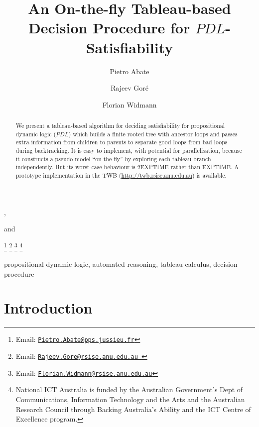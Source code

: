 \documentclass{entcs}
\newcommand{\pdl}{$PDL$}
\begin{document}
\begin{frontmatter}
  \title{An On-the-fly Tableau-based Decision Procedure for \pdl{}-Satisfiability} 
  \author[Canberra]{Pietro Abate},
  \author[Canberra]{Rajeev Gor\'e} and
  \author[Nicta]{Florian Widmann} 
  \address[Canberra]{Computer Sciences Laboratory
    \\The Australian National University
    \\ Canberra, Australia}
  \address[Nicta]{Computer Sciences Laboratory
    and Logic \& Computation Programme
    \\The Australian National University and NICTA
    \\ Canberra, Australia}
  \thanks[myemail]{Email:
    \href{mailto:Pietro.Abate@pps.jussieu.fr}
    {\texttt{\normalshape Pietro.Abate@pps.jussieu.fr}}} 
  \thanks[coemail]{Email:
    \href{mailto:Rajeev.Gore@rsise.anu.edu.au }
    {\texttt{\normalshape Rajeev.Gore@rsise.anu.edu.au }}}
  \thanks[cocoemail]{Email:
    \href{mailto:Florian.Widmann@rsise.anu.edu.au} 
    {\texttt{\normalshape Florian.Widmann@rsise.anu.edu.au}}}
  \thanks[NICTA]{National ICT Australia is
    funded by the Australian Government's Dept of Communications,
    Information Technology and the Arts and the Australian Research
    Council through Backing Australia's Ability and the ICT Centre of
    Excellence program.}
  \begin{abstract} 
    We present a tableau-based algorithm 
    for deciding satisfiability for propositional dynamic logic (\pdl{})
    which builds a finite rooted tree with ancestor loops
    and passes extra information from children to parents
    to separate good loops from bad loops during backtracking.
    It is easy to implement, with potential for parallelisation,
    because it constructs a pseudo-model ``on the fly''
    by exploring each tableau branch independently. But its
    worst-case behaviour is 2EXPTIME rather than EXPTIME.
    A prototype implementation in the TWB
    (\url{http://twb.rsise.anu.edu.au})
    is available.
  \end{abstract}
  \begin{keyword}
    propositional dynamic logic, automated reasoning, tableau calculus,
    decision procedure
  \end{keyword}
\end{frontmatter}


\section{Introduction}
\end{document}
